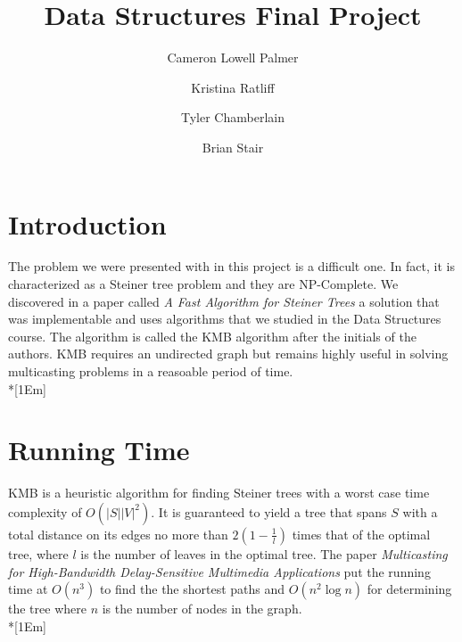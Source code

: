 \documentclass[12pt]{article}
\title{Data Structures Final Project}
\author{Cameron Lowell Palmer \and Kristina Ratliff \and Tyler Chamberlain \and Brian Stair}
\begin{document}
\maketitle
\pagebreak
\begin{raggedright}

\section*{Introduction}
The problem we were presented with in this project is a difficult one. In fact, it
is characterized as a Steiner tree problem and they are NP-Complete. We discovered
in a paper called \textit{A Fast Algorithm for Steiner Trees}\cite{ks:kmb} a solution that
was implementable and uses algorithms that we studied in the Data Structures course. 
The algorithm is called the KMB algorithm after the initials of the authors. KMB
requires an undirected graph but remains highly useful in solving multicasting 
problems in a reasoable period of time.\\*[1Em]

\section*{Running Time}
KMB is a heuristic algorithm for finding Steiner trees with a worst case time
complexity of $O(|S||V|^{2})$. It is guaranteed to yield a tree that spans $S$ with a
total distance on its edges no more than $2(1 - \frac{1}{l})$ times that of the optimal
tree, where $l$ is the number of leaves in the optimal tree. The paper \textit{Multicasting
for High-Bandwidth Delay-Sensitive Multimedia Applications}\cite{ks:kpp} put the
running time at $O(n^{3})$ to find the the shortest paths and $O(n^{2} \log n)$ for
determining the tree where $n$ is the number of nodes in the graph.\\*[1Em]


\end{raggedright}
\end{document}
